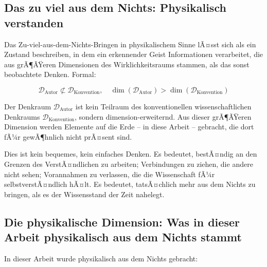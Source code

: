 ﻿\documentclass[12pt,a4paper]{report}
\begin{document}
\subsection{Das \glqq zu viel aus dem Nichts\grqq{}: Physikalisch verstanden}

Das \glqq Zu-viel-aus-dem-Nichts-Bringen\grqq{} in physikalischem Sinne lÃ¤sst sich als ein Zustand beschreiben, in dem ein erkennender Geist Informationen verarbeitet, die aus grÃ¶ÃŸeren Dimensionen des Wirklichkeitsraums stammen, als das sonst beobachtete Denken. Formal:

\begin{equation}
	\mathcal{D}_{\text{Autor}} \not\subset \mathcal{D}_{\text{Konvention}}, \quad \dim(\mathcal{D}_{\text{Autor}}) > \dim(\mathcal{D}_{\text{Konvention}})
\end{equation}

Der Denkraum $\mathcal{D}_{\text{Autor}}$ ist kein Teilraum des konventionellen wissenschaftlichen Denkraums $\mathcal{D}_{\text{Konvention}}$, sondern dimension-erweiternd. Aus dieser grÃ¶ÃŸeren Dimension werden Elemente auf die Erde -- in diese Arbeit -- gebracht, die dort fÃ¼r gewÃ¶hnlich nicht prÃ¤sent sind.

Dies ist kein bequemes, kein einfaches Denken. Es bedeutet, bestÃ¤ndig an den Grenzen des VerstÃ¤ndlichen zu arbeiten; Verbindungen zu ziehen, die andere nicht sehen; Vorannahmen zu verlassen, die die Wissenschaft fÃ¼r selbstverstÃ¤ndlich hÃ¤lt. Es bedeutet, tatsÃ¤chlich mehr aus dem Nichts zu bringen, als es der Wissensstand der Zeit nahelegt.

\subsection{Die physikalische Dimension: Was in dieser Arbeit physikalisch aus dem Nichts stammt}

In dieser Arbeit wurde physikalisch aus dem Nichts gebracht:
\end{document}
